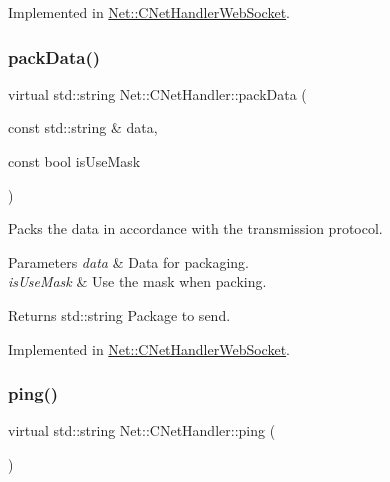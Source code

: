 Implemented in \mbox{\hyperlink{class_net_1_1_c_net_handler_web_socket_ad4c16a911b8cb26f69dda807b5ca2c70}{Net\+::\+C\+Net\+Handler\+Web\+Socket}}.

\mbox{\label{class_net_1_1_c_net_handler_a9e8b6b44b05d2acb7b7cb28c57bedcb8}} 
\subsubsection{\texorpdfstring{pack\+Data()}{packData()}}
{\footnotesize\ttfamily virtual std\+::string Net\+::\+C\+Net\+Handler\+::pack\+Data (\begin{DoxyParamCaption}\item[{const std\+::string \&}]{data,  }\item[{const bool}]{is\+Use\+Mask }\end{DoxyParamCaption})\hspace{0.3cm}{\ttfamily [pure virtual]}}



Packs the data in accordance with the transmission protocol. 


\begin{DoxyParams}{Parameters}
{\em data} & Data for packaging. \\
\hline
{\em is\+Use\+Mask} & Use the mask when packing. \\
\hline
\end{DoxyParams}
\begin{DoxyReturn}{Returns}
std\+::string Package to send. 
\end{DoxyReturn}


Implemented in \mbox{\hyperlink{class_net_1_1_c_net_handler_web_socket_aa408c8c686da45c36969a7dcf7478daa}{Net\+::\+C\+Net\+Handler\+Web\+Socket}}.

\mbox{\label{class_net_1_1_c_net_handler_af905edf8c2f5dee54f278f78d66b400d}} 
\subsubsection{\texorpdfstring{ping()}{ping()}}
{\footnotesize\ttfamily virtual std\+::string Net\+::\+C\+Net\+Handler\+::ping (\begin{DoxyParamCaption}{ }\end{DoxyParamCaption})\hspace{0.3cm}{\ttfamily [pure virtual]}}



